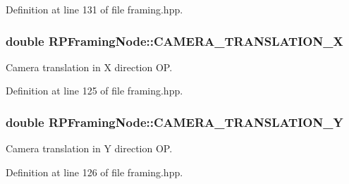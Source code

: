 \-Definition at line 131 of file framing.\-hpp.

\hypertarget{class_r_p_framing_node_a583866e6d7361f07a7fdd5e0d357b251}{
\subsubsection[{\-C\-A\-M\-E\-R\-A\-\_\-\-T\-R\-A\-N\-S\-L\-A\-T\-I\-O\-N\-\_\-\-X}]{\setlength{\rightskip}{0pt plus 5cm}double {\bf \-R\-P\-Framing\-Node\-::\-C\-A\-M\-E\-R\-A\-\_\-\-T\-R\-A\-N\-S\-L\-A\-T\-I\-O\-N\-\_\-\-X}}}\label{class_r_p_framing_node_a583866e6d7361f07a7fdd5e0d357b251}
\-Camera translation in \-X direction \-O\-P. 

\-Definition at line 125 of file framing.\-hpp.

\hypertarget{class_r_p_framing_node_a64ee86907af0fccc401e72fcbfac8df4}{
\subsubsection[{\-C\-A\-M\-E\-R\-A\-\_\-\-T\-R\-A\-N\-S\-L\-A\-T\-I\-O\-N\-\_\-\-Y}]{\setlength{\rightskip}{0pt plus 5cm}double {\bf \-R\-P\-Framing\-Node\-::\-C\-A\-M\-E\-R\-A\-\_\-\-T\-R\-A\-N\-S\-L\-A\-T\-I\-O\-N\-\_\-\-Y}}}\label{class_r_p_framing_node_a64ee86907af0fccc401e72fcbfac8df4}
\-Camera translation in \-Y direction \-O\-P. 

\-Definition at line 126 of file framing.\-hpp.

